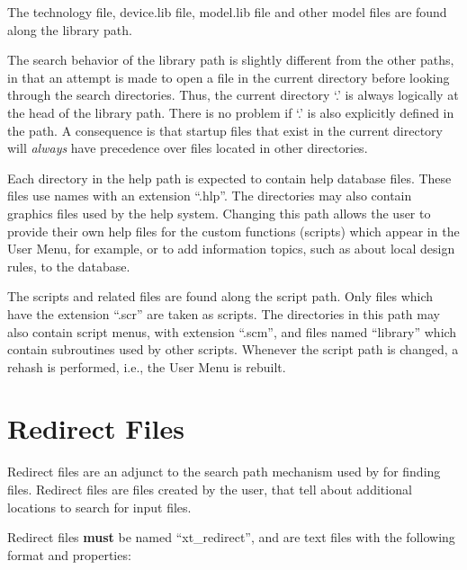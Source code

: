 \begin{itemize}
The technology file, {\vt device.lib} file, {\vt model.lib} file and
other model files are found along the library path.

The search behavior of the library path is slightly different from the
other paths, in that an attempt is made to open a file in the current
directory before looking through the search directories.  Thus, the
current directory `.' is always logically at the head of the library
path.  There is no problem if `.' is also explicitly defined in the
path.  A consequence is that startup files that exist in the current
directory will {\it always} have precedence over files located in
other directories.

Each directory in the help path is expected to contain help database
files.  These files use names with an extension ``{\vt .hlp}''.  The
directories may also contain graphics files used by the help system. 
Changing this path allows the user to provide their own help files for
the custom functions (scripts) which appear in the {\cb User Menu},
for example, or to add information topics, such as about local design
rules, to the database.

The scripts and related files are found along the script path.  Only
files which have the extension ``{\vt .scr}'' are taken as scripts. 
The directories in this path may also contain script menus, with
extension ``{\vt .scm}'', and files named ``{\vt library}'' which
contain subroutines used by other scripts.  Whenever the script path
is changed, a {\cb rehash} is performed, i.e., the {\cb User Menu} is
rebuilt.


\section{Redirect Files}
Redirect files are an adjunct to the search path mechanism used by
{\Xic} for finding files.  Redirect files are files created by the
user, that tell {\Xic} about additional locations to search for input
files.

Redirect files {\bf must} be named ``{\vt xt\_redirect}'', and are
text files with the following format and properties:


\end{itemize}
